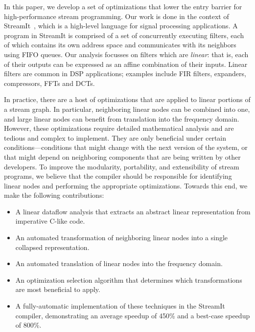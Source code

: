 In this paper, we develop a set of optimizations that lower the entry
barrier for high-performance stream programming.  Our work is done in
the context of StreamIt~\cite{streamit-asplos,streamitcc}, which is a
high-level language for signal processing applications.  A program in
StreamIt is comprised of a set of concurrently executing filters, each
of which contains its own address space and communicates with its
neighbors using FIFO queues.  Our analysis focusses on filters which
are {\it linear}: that is, each of their outputs can be expressed as
an affine combination of their inputs.  Linear filters are common in
DSP applications; examples include FIR filters, expanders,
compressors, FFTs and DCTs.

In practice, there are a host of optimizations that are applied to
linear portions of a stream graph.  In particular, neighboring linear
nodes can be combined into one, and large linear nodes can benefit
from translation into the frequency domain.  However, these
optimizations require detailed mathematical analysis and are tedious
and complex to implement.  They are only beneficial under certain
conditions---conditions that might change with the next version of the
system, or that might depend on neighboring components that are being
written by other developers.  To improve the modularity, portability,
and extensibility of stream programs, we believe that the compiler
should be responsible for identifying linear nodes and performing the
appropriate optimizations.  Towards this end, we make the following
contributions:
\begin{itemize}
\vspace{-6pt}

\item A linear dataflow analysis that extracts an abstract linear
representation from imperative C-like code.
\vspace{-6pt}

\item An automated transformation of neighboring linear nodes into a
single collapsed representation.
\vspace{-6pt}

\item An automated translation of linear nodes into the frequency
domain.
\vspace{-6pt}

\item An optimization selection algorithm that determines which
transformations are most beneficial to apply.
\vspace{-6pt}

\item A fully-automatic implementation of these techniques in the
StreamIt compiler, demonstrating an average speedup of 450\% and a
best-case speedup of 800\%.
\vspace{-6pt}

\end{itemize}

